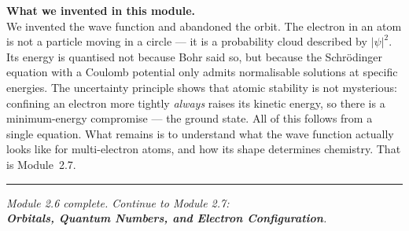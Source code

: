 \documentclass[12pt, a4paper]{book}
\begin{document}
\vspace{1.5em}
\begin{center}
\begin{tcolorbox}[enhanced, colback=DiscoveryColor!8, colframe=DiscoveryColor,
  width=0.88\textwidth, arc=3pt]
\centering\sffamily\small
\textbf{What we invented in this module.}\\[4pt]
We invented the wave function and abandoned the orbit.
The electron in an atom is not a particle moving in a circle ---
it is a probability cloud described by $|\psi|^2$.
Its energy is quantised not because Bohr said so, but because
the Schr\"{o}dinger equation with a Coulomb potential only
admits normalisable solutions at specific energies.
The uncertainty principle shows that atomic stability is
not mysterious: confining an electron more tightly
\emph{always} raises its kinetic energy, so there is
a minimum-energy compromise --- the ground state.
All of this follows from a single equation.
What remains is to understand what the wave function
actually looks like for multi-electron atoms,
and how its shape determines chemistry.
That is Module~2.7.
\end{tcolorbox}
\end{center}

\vspace{2em}
\noindent\textcolor{JourneyColor!40}{\rule{\textwidth}{0.6pt}}
\begin{center}
\textit{\sffamily\small
Module 2.6 complete. Continue to Module 2.7:\\
\textbf{Orbitals, Quantum Numbers, and Electron Configuration}.}
\end{center}
\end{document}
